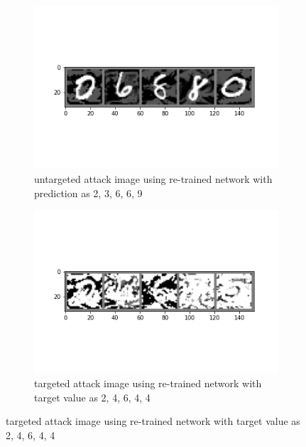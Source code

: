 \documentclass{article}
\begin{document}
\begin{enumerate}
     	\begin{figure}[H]
     	\centering
     	\begin{subfigure}[b]{0.45\textwidth}
         	\centering
         	\includegraphics[width=\textwidth]
         	{image/re_batch_untarget_new_image.png}
         	\caption{untargeted attack image using re-trained network with prediction as 2, 3, 6, 6, 9}
         	\label{fig:Hyperplane Epoch 0}
     	\end{subfigure}
     	\hfill
     	\begin{subfigure}[b]{0.45\textwidth}
         	\centering
         	\includegraphics[width=\textwidth]
         	{image/re_batch_target_new_image.png}
         	\caption{targeted attack image using re-trained network with target value as 2, 4, 6, 4, 4}
         	\label{fig:Hyperplane Epoch 1000}
     	\end{subfigure}
     	\end{figure}
     	

\end{enumerate}
\end{document}
